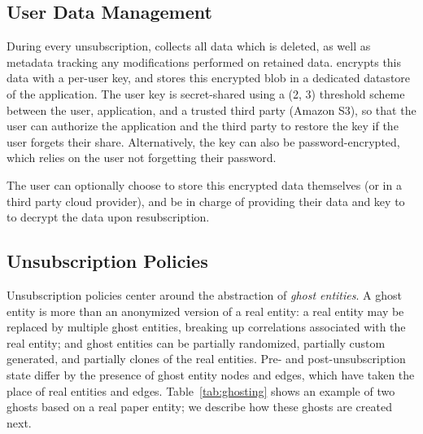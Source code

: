 \subsection{User Data Management}
\label{sec:design:storage}
During every unsubscription, \sys collects all data which is deleted, as well as metadata tracking
any modifications performed on retained data.  \sys encrypts this data with a per-user key, and
stores this encrypted blob in a dedicated datastore of the application. The user key is
secret-shared using a (2, 3) threshold scheme~\cite{secretsharing} between the user, application,
and a trusted third party (\eg Amazon S3), so that the user can authorize the application and the
third party to restore the key if the user forgets their share.  Alternatively, the key can also be
password-encrypted, which relies on the user not forgetting their password.

The user can optionally choose to store this encrypted data themselves (or in a third party cloud
provider), and be in charge of providing their data and key to \sys to decrypt the data upon
resubscription.

\subsection{Unsubscription Policies}
\label{sec:design:unsub}

Unsubscription policies center around the abstraction of \emph{ghost entities}. A ghost entity is
more than an anonymized version of a real entity: a real entity may be replaced by multiple ghost
entities, breaking up correlations associated with the real entity; and ghost entities can be
partially randomized, partially custom generated, and partially clones of the real entities.
Pre- and post-unsubscription state differ by the presence of ghost entity nodes and edges, which
have taken the place of real entities and edges. 
Table~\ref{tab:ghosting} shows an example of two ghosts based on a real paper entity; we describe
how these ghosts are created next.

